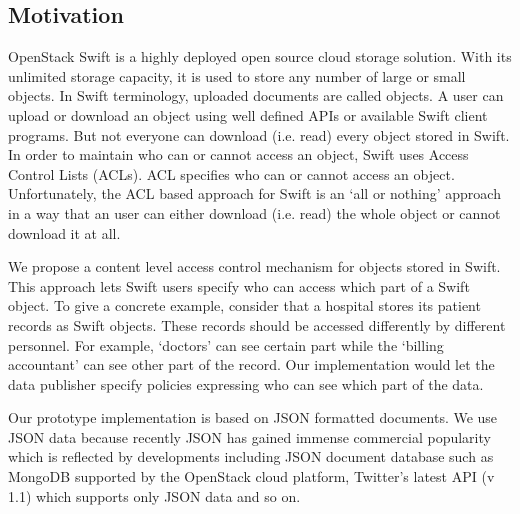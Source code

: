 \subsection{Motivation}
OpenStack  Swift is a highly deployed open source cloud storage solution. With its unlimited storage capacity, it is used to store any number of large or small objects. In Swift terminology, uploaded documents are called objects.  A user can  upload or download an object using well defined APIs or available Swift client programs. But not everyone can download (i.e. read) every object stored in Swift. In order to maintain who can or cannot access an object, Swift uses Access Control Lists (ACLs). ACL specifies who can or cannot access an object. Unfortunately, the ACL based approach for Swift is an `all or nothing' approach in a way that an user can either download (i.e. read) the whole object or cannot download it at all.

We propose a content level access control mechanism for objects  stored in Swift.  This approach lets Swift users specify who can access which part of a Swift object. To give a concrete example, consider that a hospital stores its patient records  as  Swift objects. These records should be accessed differently by different personnel. For example, `doctors' can see certain part  while the `billing accountant' can see other part of the record. Our implementation would let the data publisher specify policies expressing who can see which part of the data.

Our prototype implementation is based on JSON formatted documents. We use JSON data because recently JSON has gained immense commercial popularity which is reflected by developments including JSON document database such as MongoDB supported by the OpenStack cloud platform, Twitter's latest API (v 1.1) which supports only JSON data and so on.
